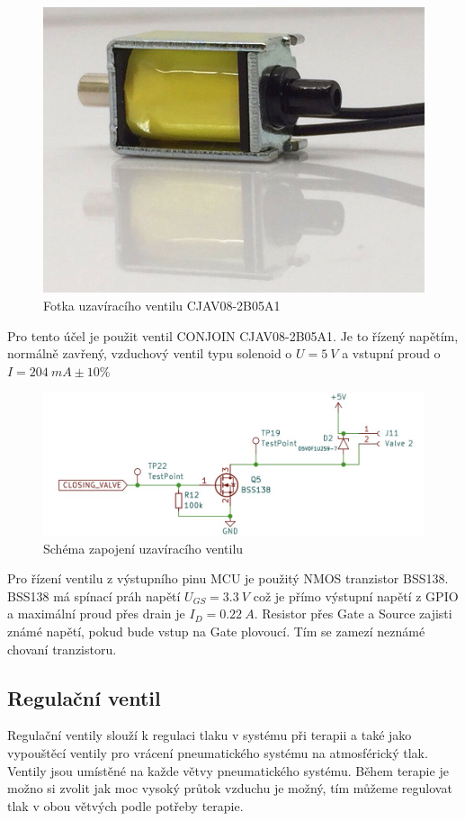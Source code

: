 \begin{figure}[H]
    \includegraphics[width=0.9\linewidth]{pictures/closing_valve.jpg}
    \caption{Fotka uzavíracího ventilu CJAV08-2B05A1}
    \label{fig:closing_valve}
\end{figure}

Pro tento účel je použit ventil CONJOIN CJAV08-2B05A1. Je to řízený napětím, normálně zavřený, vzduchový ventil typu solenoid  o $U = 5 \ V$ a vstupní proud o $I = 204 \ mA \pm 10\% $

\begin{figure}[H]
    \includegraphics[width=0.9\linewidth]{pictures/closing_valve_driver.jpg}
    \caption{Schéma zapojení uzavíracího ventilu}
    \label{fig:closing_valve_driver}
\end{figure}

Pro řízení ventilu z výstupního pinu MCU je použitý NMOS tranzistor BSS138. BSS138 má spínací práh napětí $U_{GS} = 3.3 \ V$ což je přímo výstupní napětí z GPIO a maximální proud přes drain je $I_D = 0.22 \ A$. Resistor přes Gate a Source zajisti známé napětí, pokud bude vstup na Gate plovoucí. Tím se zamezí neznámé chovaní tranzistoru.

\subsection{Regulační ventil}
Regulační ventily slouží k regulaci tlaku v systému při terapii a také jako vypouštěcí ventily pro vrácení pneumatického systému na atmosférický tlak. Ventily jsou umístěné na každe větvy pneumatického systému. Během terapie je možno si zvolit jak moc vysoký průtok vzduchu je možný, tím můžeme regulovat tlak v obou větvých podle potřeby terapie. \par


